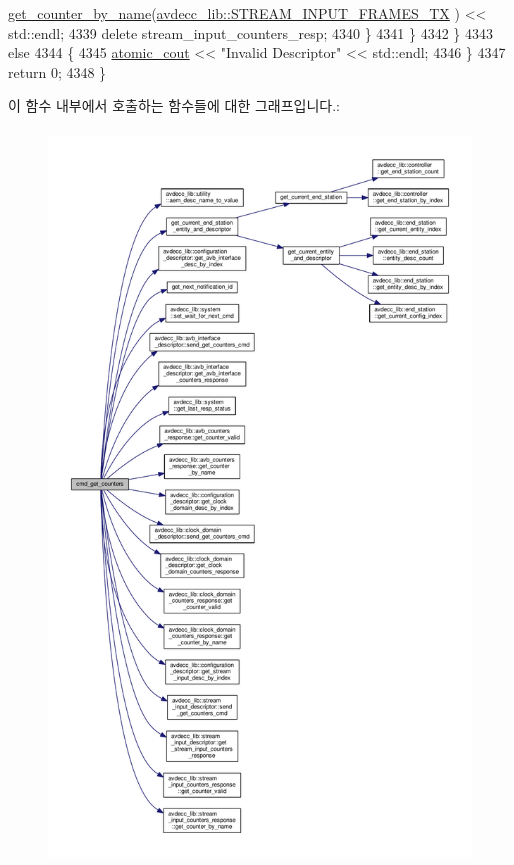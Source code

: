 \begin{DoxyCode}
      \hyperlink{classavdecc__lib_1_1stream__input__counters__response_aad68050f63fc17c24527b3157d6ca8c7}{get\_counter\_by\_name}(\hyperlink{namespaceavdecc__lib_a831be56dba8ac423258a9374a1202df4a0b0a7b71f908ef6d8bbafd7d9a36ec57}{avdecc\_lib::STREAM\_INPUT\_FRAMES\_TX}
      ) << std::endl;
4339                 \textcolor{keyword}{delete} stream\_input\_counters\_resp;
4340             \}
4341         \}
4342     \}
4343     \textcolor{keywordflow}{else}
4344     \{
4345         \hyperlink{cmd__line_8h_a0bc38ccc65c79ba06c6fcd7b4bf554c3}{atomic\_cout} << \textcolor{stringliteral}{"Invalid Descriptor"} << std::endl;
4346     \}
4347     \textcolor{keywordflow}{return} 0;
4348 \}
\end{DoxyCode}


이 함수 내부에서 호출하는 함수들에 대한 그래프입니다.\+:
\nopagebreak
\begin{figure}[H]
\begin{center}
\leavevmode
\includegraphics[height=550pt]{classcmd__line_a0755c104c8ceca24300025ecf1ed1c4d_cgraph}
\end{center}
\end{figure}




